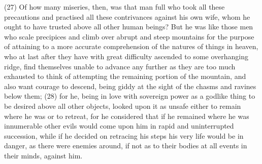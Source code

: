 (27) Of how many miseries, then, was that man full who took all these precautions and practised all
these contrivances against his own wife, whom he ought to have trusted above all other human
beings? But he was like those men who scale precipices and climb over abrupt and steep
mountains for the purpose of attaining to a more accurate comprehension of the natures of things
in heaven, who at last after they have with great difficulty ascended to some overhanging ridge,
find themselves unable to advance any further as they are too much exhausted to think of
attempting the remaining portion of the mountain, and also want courage to descend, being giddy at
the sight of the chasms and ravines below them; (28) for he, being in love with sovereign power as
a godlike thing to be desired above all other objects, looked upon it as unsafe either to remain
where he was or to retreat, for he considered that if he remained where he was innumerable other
evils would come upon him in rapid and uninterrupted succession, while if he decided on retracing
his steps his very life would be in danger, as there were enemies around, if not as to their bodies at
all events in their minds, against him.

